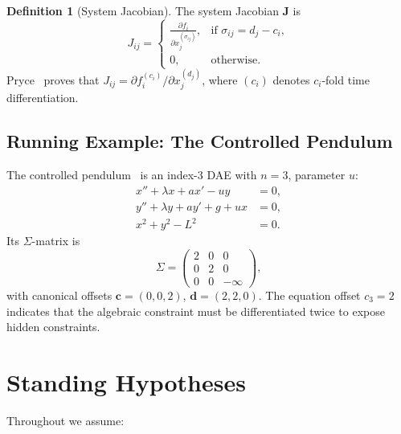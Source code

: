 \documentclass[12pt,a4paper]{article}
\theoremstyle{definition}
\newtheorem{definition}{Definition}[section]
\theoremstyle{plain}
\theoremstyle{remark}
\newcommand{\vc}{\mathbf{c}}
\newcommand{\vd}{\mathbf{d}}
\newcommand{\Jb}{\mathbf{J}}
\begin{document}
\begin{definition}[System Jacobian]
The system Jacobian $\Jb$ is
\[
  J_{ij} =
  \begin{cases}
    \displaystyle\frac{\partial f_i}{\partial x_j^{(\sigma_{ij})}},
      & \text{if } \sigma_{ij} = d_j - c_i, \\[8pt]
    0, & \text{otherwise}.
  \end{cases}
\]
Pryce~\cite{pryce2001simple} proves that $J_{ij} = \partial f_i^{(c_i)} / \partial x_j^{(d_j)}$, where ${(c_i)}$ denotes $c_i$-fold time differentiation.
\end{definition}

\subsection{Running Example: The Controlled Pendulum}

The controlled pendulum~\cite{campbell2016solving} is an index-3 DAE with $n=3$, parameter $u$:
\begin{equation}\label{eq:pendulum}
  \begin{aligned}
    x'' + \lambda x + a x' - u y &= 0, \\
    y'' + \lambda y + a y' + g + u x &= 0, \\
    x^2 + y^2 - L^2 &= 0.
  \end{aligned}
\end{equation}
Its $\Sigma$-matrix is
\[
  \Sigma =
  \begin{pmatrix}
    2 & 0 & 0 \\
    0 & 2 & 0 \\
    0 & 0 & -\infty
  \end{pmatrix},
\]
with canonical offsets $\vc=(0,0,2)$, $\vd=(2,2,0)$. The equation offset $c_3=2$ indicates that the algebraic constraint must be differentiated twice to expose hidden constraints.

\section{Standing Hypotheses}

Throughout we assume:
\end{document}
